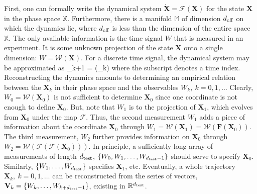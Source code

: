First, one can formally write the dynamical system $\mathbf{\dot{X}} = \mathbf{\mathcal{F}} (\mathbf{X})$ for the state $\mathbf{X}$ in the phase space $\mathbb{X}$. Furthermore,
there is a manifold $\mathbb{M}$ of dimension $d_{\rm{eff}}$ on which the dynamics lie, where  $d_{\rm{eff}}$ is less than the dimension of the entire space $\mathbb{X}$. The only available
information is the time signal $W$ that is measured in an experiment. 
It is some unknown projection of the state $\mathbf{X}$ onto a single dimension: $W = \mathcal{W} ({\mathbf{X}})$. 
For a discrete time signal, the dynamical system may be approximated as
\beq
\label{dyn_sys_approx}
{}_{k+1} = {} ({}_k)
\eeq
where the subscript denotes a time index. Reconstructing the dynamics amounts to determining an empirical relation between the ${\mathbf{X}}_k$ in their phase space and the observables
$W_k, \ k=0,1, \ldots$ Clearly, $W_0 = {\mathcal{W}}({\mathbf{X}}_0)$ is not sufficient to determine ${\mathbf{X}}_0$ since one coordinate is not enough to define ${\mathbf{X}}_0$. But, note that
$W_1$ is to the projection of ${\mathbf{X}}_1$, which evolves from ${\mathbf{X}}_0$ under the map $\mathbf{\mathcal{F}}$. Thus, the second measurement $W_1$ adds a piece of information
about the coordinate ${\mathbf{X}}_0$ through $W_1 = {\mathcal{W}}({\mathbf{X}}_1) = {\mathcal{W}}({\mathcal{\mathbf{F}}} ({\mathbf{X}}_0))$. The third measurement, $W_2$ further provides information
on ${\mathbf{X}}_0$ through $W_2 = {\mathcal{W}}({\mathcal{F}} ({\mathcal{F}} ({\mathbf{X}}_0)))$. 
In principle, a sufficiently long array of measurements of length $d_{\rm{test}}$, $\{W_0, W_1, \ldots , W_{d_{\rm{test}}-1}\}$ should serve to specify
${\mathbf{X}}_0$. Similarly, $\{W_1, \ldots , W_{d_{\rm{test}}}\}$ specifies ${\mathbf{X}}_1$, etc. 
Eventually, a whole trajectory ${\mathbf{X}}_k, \ k=0,1,\ldots$ can be reconstructed from the series of vectors,
${\mathbf{V}}_k = \{W_k, \ldots , W_{k+d_{\rm{test}}-1}\}$, existing in ${\mathbb{R}}^{d_{\rm{test}}}$.

